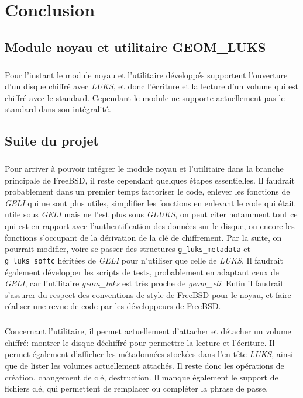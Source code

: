 \chapter{Conclusion}
\section{Module noyau et utilitaire GEOM\_LUKS}

\paragraph{}
Pour l'instant le module noyau et l'utilitaire développés supportent l'ouverture
d'un disque chiffré avec {\em LUKS}, et donc l'écriture et la lecture d'un
volume qui est chiffré avec le standard. Cependant le module ne supporte
actuellement pas le standard dans son intégralité.


\section{Suite du projet}
\paragraph{}
Pour arriver à pouvoir intégrer le module noyau et l'utilitaire dans la branche
principale de FreeBSD, il reste cependant quelques étapes essentielles. Il
faudrait probablement dans un premier temps factoriser le code, enlever les
fonctions de {\em GELI} qui ne sont plus utiles, simplifier les fonctions en
enlevant le code qui était utile sous {\em GELI} mais ne l'est plus sous
{\em GLUKS}, on peut citer notamment tout ce qui est en rapport avec
l'authentification des données sur le disque, ou encore les fonctions s'occupant
de la dérivation de la clé de chiffrement. Par la suite, on pourrait modifier,
voire se passer des structures \texttt{g\_luks\_metadata} et
\texttt{g\_luks\_softc} héritées de {\em GELI} pour n'utiliser que celle de {\em
  LUKS}. Il faudrait également développer les scripts de tests, probablement en
adaptant ceux de {\em   GELI}, car l'utilitaire {\em geom\_luks} est très proche
de {\em geom\_eli}. Enfin il faudrait s'assurer du respect des conventions de
style de FreeBSD pour le noyau, et faire réaliser une revue de code par les
développeurs de FreeBSD.

\paragraph{}
Concernant l'utilitaire, il permet actuellement d'attacher et détacher un volume
chiffré: montrer le disque déchiffré pour permettre la lecture et l'écriture. Il
permet également d'afficher les métadonnées stockées dans l'en-tête {\em LUKS},
ainsi que de lister les volumes actuellement attachés. Il reste donc les
opérations de création, changement de clé, destruction. Il manque également le
support de fichiers clé, qui permettent de remplacer ou compléter la phrase de
passe.

